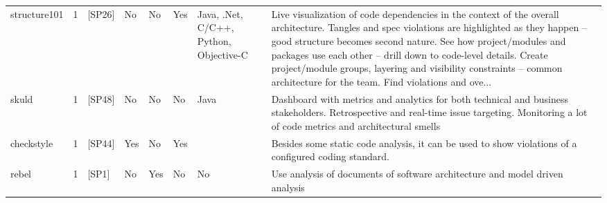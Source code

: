 \begin{tabular}{lrllllll}
        structure101 &      1 &                                                 [SP26] &    No &       No &       Yes &                                                                                                                                                  Java, .Net, C/C++, Python, Objective-C &  Live visualization of code dependencies in the context of the overall architecture. Tangles and spec violations are highlighted as they happen – good structure becomes second nature. See how project/modules and packages use each other – drill down to code-level details. Create project/module groups, layering and visibility constraints – common architecture for the team. Find violations and ove... \\
               skuld &      1 &                                                 [SP48] &    No &       No &        No &                                                                                                                                                                                    Java &                                                                                                                                                                                                                        Dashboard with metrics and analytics for both technical and business stakeholders. Retrospective and real-time issue targeting. Monitoring a lot of code metrics and architectural smells \\
          checkstyle &      1 &                                                 [SP44] &   Yes &       No &       Yes &                                                                                                                                                                                         &                                                                                                                                                                                                                                                                                                            Besides some static code analysis, it can be used to show violations of a configured coding standard. \\
               rebel &      1 &                                                  [SP1] &    No &      Yes &        No &                                                                                                                                                                                      No &                                                                                                                                                                                                                                                                                                                                     Use analysis of documents of software architecture and model driven analysis \\

\end{tabular}

